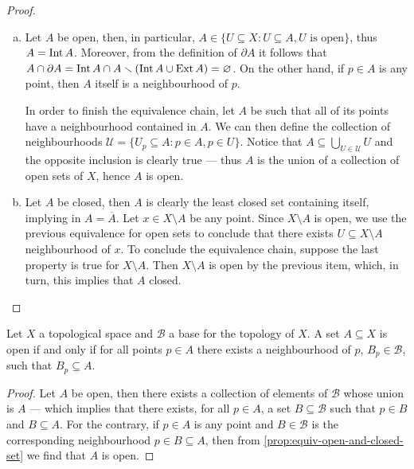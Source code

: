 \begin{proof}
\begin{enumerate}[(a)]\setlength\itemsep{0em}
\item Let \(A\) be open, then, in particular, \(A \in \{U \subseteq X
  \colon U \subseteq A, U \text{ is open}\}\), thus \(A = \operatorname{Int} A\). Moreover, from
  the definition of \(\partial A\) it follows that \(A \cap \partial A = \operatorname{Int} A
  \cap A \smallsetminus (\operatorname{Int} A \cup \operatorname{Ext} A) = \varnothing\). On the other hand, if \(p
  \in A\) is any point, then \(A\) itself is a neighbourhood of \(p\).

  In order to finish the equivalence chain, let \(A\) be such that all of its
  points have a neighbourhood contained in \(A\). We can then define the
  collection of neighbourhoods \(\mathcal U = \{U_p \subseteq A \colon p \in A, p \in
  U\}\). Notice that \(A \subseteq \bigcup_{U \in \mathcal U} U\) and the
  opposite inclusion is clearly true --- thus \(A\) is the union of a collection
  of open sets of \(X\), hence \(A\) is open.

\item Let \(A\) be closed, then \(A\) is clearly the least closed set containing
  itself, implying in \(A = \overline A\). Let \(x \in X \setminus A\) be any
  point. Since \(X \setminus A\) is open, we use the previous equivalence for
  open sets to conclude that there exists \(U \subseteq X \setminus A\)
  neighbourhood of \(x\).  To conclude the equivalence chain, suppose the last
  property is true for \(X \setminus A\). Then \(X \setminus A\) is open by the
  previous item, which, in turn, this implies that \(A\) closed.
\end{enumerate}
\end{proof}

\begin{proposition}
Let \(X\) a topological space and \(\mathcal B\) a base for the topology of
\(X\). A set \(A \subseteq X\) is open if and only if for all points \(p \in
A\) there exists a neighbourhood of \(p\), \(B_p \in \mathcal B\), such that
\(B_p \subseteq A\).
\end{proposition}

\begin{proof}
Let \(A\) be open, then there exists a collection of elements of \(\mathcal B\)
whose union is \(A\) --- which implies that there exists, for all \(p \in A\), a
set \(B \subseteq \mathcal B\) such that \(p \in B\) and \(B \subseteq
A\). For the contrary, if \(p \in A\) is any point and \(B \in \mathcal B\) is
the corresponding neighbourhood \(p \in B \subseteq A\), then from
\cref{prop:equiv-open-and-closed-set} we find that \(A\) is open.
\end{proof}

